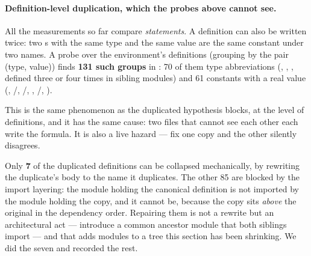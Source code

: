 \paragraph{Definition-level duplication, which the probes above cannot see.} All the
measurements so far compare \emph{statements}. A definition can also be written twice: two
s with the same type and the same value are the same constant under two names. A
probe over the environment's definitions (grouping by the pair (type, value)) finds
\textbf{131 such groups} in : 70 of them type abbreviations
(, , ,  defined three or four times in
sibling modules) and 61 constants with a real value (,
/, /,
, /, ).

This is the same phenomenon as the duplicated hypothesis blocks, at the level of
definitions, and it has the same cause: two files that cannot see each other each write the
formula. It is also a live hazard --- fix one copy and the other silently disagrees.

Only \textbf{7} of the duplicated definitions can be collapsed mechanically, by rewriting
the duplicate's body to the name it duplicates. The other 85 are blocked by the import
layering: the module holding the canonical definition is not imported by the module holding
the copy, and it cannot be, because the copy sits \emph{above} the original in the
dependency order. Repairing them is not a rewrite but an architectural act --- introduce a
common ancestor module that both siblings import --- and that adds modules to a tree this
section has been shrinking. We did the seven and recorded the rest.
